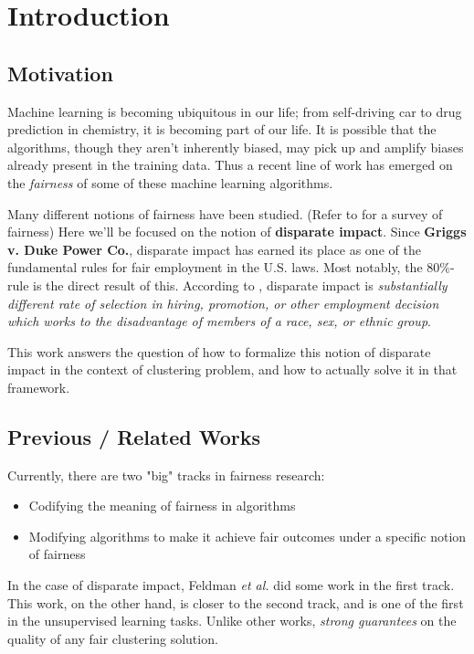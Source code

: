 \chapter{Introduction}

\section{Motivation}

Machine learning is becoming ubiquitous in our life; from self-driving car to drug prediction in chemistry, it is becoming part of our life. It is possible that the algorithms, though they aren't inherently biased, may pick up and amplify biases already present in the training data.
Thus a recent line of work has emerged on the {\it fairness} of some of these machine learning algorithms.

Many different notions of fairness have been studied. (Refer to \cite{Mehrabi2019}\cite{Zhong2019} for a survey of fairness)
Here we'll be focused on the notion of {\bf disparate impact}.
Since {\bf Griggs v. Duke Power Co.}\cite{Griggs1971}, disparate impact has earned its place as one of the fundamental rules for fair employment in the U.S. laws. Most notably, the $80\%$-rule\cite{Biddle2006} is the direct result of this.
According to \cite{uniform}, disparate impact is {\it substantially different rate of selection in hiring, promotion, or other employment decision which works to the disadvantage of members of a race, sex, or ethnic group}.

This work answers the question of how to formalize this notion of disparate impact in the context of clustering problem, and how to actually solve it in that framework.


\section{Previous / Related Works}

Currently, there are two "big" tracks in fairness research:
\begin{itemize}
	\item Codifying the meaning of fairness in algorithms
	\item Modifying algorithms to make it achieve fair outcomes under a specific notion of fairness
\end{itemize}

In the case of disparate impact, Feldman {\it et al.}\cite{Feldman2015} did some work in the first track. This work, on the other hand, is closer to the second track, and is one of the first in the unsupervised learning tasks.
Unlike other works, {\it strong guarantees} on the quality of any fair clustering solution.


